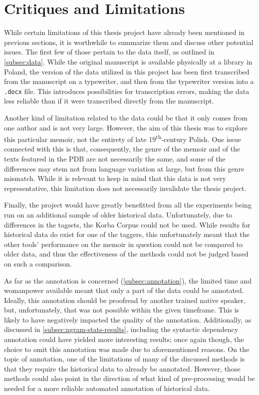 \section{Critiques and Limitations}
\label{sec:critiques}

While certain limitations of this thesis project have already been mentioned in previous sections, it is worthwhile to summarize them and discuss other potential issues. The first few of those pertain to the data itself, as outlined in \autoref{subsec:data}. While the original manuscript is available physically at a library in Poland, the version of the data utilized in this project has been first transcribed from the manuscript on a typewriter, and then from the typewriter version into a \texttt{.docx} file. This introduces possibilities for transcription errors, making the data less reliable than if it were transcribed directly from the manuscript. 

Another kind of limitation related to the data could be that it only comes from one author and is not very large. However, the aim of this thesis was to explore this particular memoir, not the entirety of late 19\textsuperscript{th}-century Polish. One issue connected with this is that, consequently, the genre of the memoir and of the texts featured in the PDB are not necessarily the same, and some of the differences may stem not from language variation at large, but from this genre mismatch. While it is relevant to keep in mind that this data is not very representative, this limitation does not necessarily invalidate the thesis project.

Finally, the project would have greatly benefitted from all the experiments being run on an additional sample of older historical data. Unfortunately, due to differences in the tagsets, the Korba Corpus could not be used. While results for historical data do exist for one of the taggers, this unfortunately meant that the other tools' performance on the memoir in question could not be compared to older data, and thus the effectiveness of the methods could not be judged based on such a comparison.

As far as the annotation is concerned (\autoref{subsec:annotation}), the limited time and womanpower available meant that only a part of the data could be annotated. Ideally, this annotation should be proofread by another trained native speaker, but, unfortunately, that was not possible within the given timeframe. This is likely to have negatively impacted the quality of the annotation. Additionally, as discussed in \autoref{subsec:ngram-stats-results}, including the syntactic dependency annotation could have yielded more interesting results; once again though, the choice to omit this annotation was made due to aforementioned reasons. On the topic of annotation, one of the limitations of many of the discussed methods is that they require the historical data to already be annotated. However, those methods could also point in the direction of what kind of pre-processing would be needed for a more reliable automated annotation of historical data.

